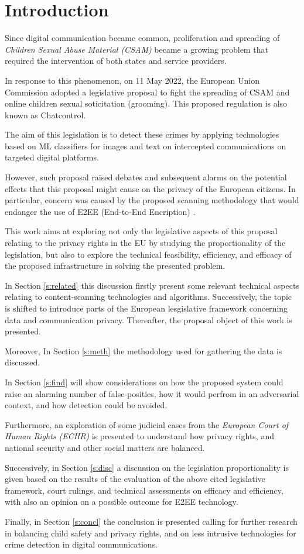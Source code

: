 \section{Introduction}

Since digital communication became common, proliferation and spreading of \textit{Children Sexual Abuse Material (CSAM)} became a growing problem that required the intervention of both states and service providers. 

In response to this phenomenon, on 11 May 2022, the European Union Commission adopted a legislative proposal to fight the spreading of CSAM and online children sexual soticitation (grooming)\cite{eu2023chatcontrol}. This proposed regulation is also known as Chatcontrol.

The aim of this legislation is to detect these crimes by applying technologies based on ML classifiers for images and text on intercepted communications on targeted digital platforms. 

However, such proposal raised debates and subsequent alarms on the potential effects that this proposal might cause on the privacy of the European citizens. In particular, concern was caused by the proposed scanning methodology that would endanger the use of E2EE (End-to-End Encription) \cite{effects}.

This work aims at exploring not only the legislative aspects of this proposal relating to the privacy rights in the EU by studying the proportionality of the legislation, but also to explore the technical feasibility, efficiency, and efficacy of the proposed infrastructure in solving the presented problem.

In Section \ref{s:related} this discussion firstly present some relevant technical aspects relating to content-scanning technologies and algorithms. Successively, the topic is shifted to introduce parts of the European lesgislative framework concerning data and communication privacy. Thereafter, the proposal object of this work is presented.

Moreover, In Section \ref{s:meth} the methodology used for gathering the data is discussed.

In Section \ref{s:find} will show considerations on how the proposed system could raise an alarming number of false-posities, how it would perfrom in an adversarial context, and how detection could be avoided.

Furthermore, an exploration of some judicial cases from the \textit{European Court of Human Rights (ECHR)} is presented to understand how privacy rights, and national security and other social matters are balanced.

Successively, in Section \ref{s:disc} a discussion on the legislation proportionality is given based on the results of the evaluation of the above cited legislative framework, court rulings, and technical assessments on efficacy and efficiency, with also an opinion on a possible outcome for E2EE technology.

Finally, in Section \ref{s:concl} the conclusion is presented calling for further research in balancing child safety and privacy rights, and on less intrusive technologies for crime detection in digital communications.